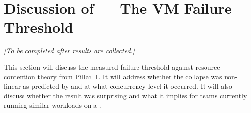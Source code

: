 \section{Discussion of  --- The VM Failure Threshold}

\textit{[To be completed after results are collected.]}

This section will discuss the measured failure threshold against resource contention theory
from Pillar~1. It will address whether the collapse was non-linear as predicted by
\citet{nanda1991} and at what concurrency level it occurred. It will also discuss whether
the result was surprising and what it implies for teams currently running similar workloads
on a \vm{}.
